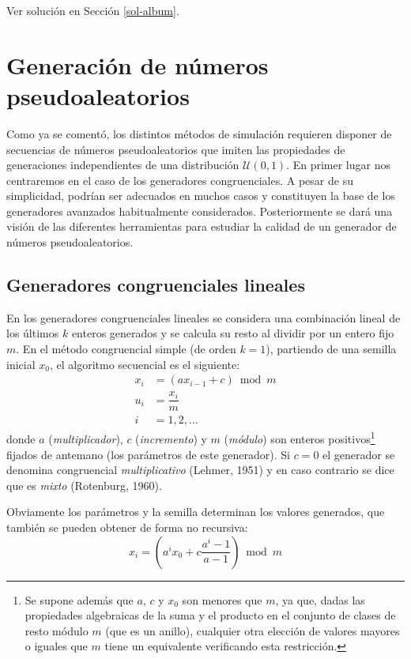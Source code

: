 \documentclass[
]{book}
\theoremstyle{break}
\theoremstyle{nonumberplain}
\begin{document}
Ver solución en Sección \ref{sol-album}.

\hypertarget{gen-pseudo}{%
\chapter{Generación de números pseudoaleatorios}\label{gen-pseudo}}

Como ya se comentó, los distintos métodos de simulación requieren disponer de secuencias de números pseudoaleatorios que imiten las propiedades de generaciones independientes de una distribución \(\mathcal{U}(0,1)\).
En primer lugar nos centraremos en el caso de los generadores congruenciales. A pesar de su simplicidad, podrían ser adecuados en muchos casos y constituyen la base de los generadores avanzados habitualmente considerados.
Posteriormente se dará una visión de las diferentes herramientas para estudiar la calidad de un generador de números pseudoaleatorios.

\hypertarget{gen-cong}{%
\section{Generadores congruenciales lineales}\label{gen-cong}}

En los generadores congruenciales lineales se considera una combinación lineal de los últimos \(k\) enteros generados y se calcula su resto al dividir por un entero fijo \(m\).
En el método congruencial simple (de orden \(k = 1\)), partiendo de una semilla inicial \(x_0\), el algoritmo secuencial es el siguiente:
\[\begin{aligned}
x_{i}  & = (ax_{i-1}+c) \bmod m \\
u_{i}  & = \dfrac{x_{i}}{m} \\
i  & =1,2,\ldots
\end{aligned}\]
donde \(a\) (\emph{multiplicador}), \(c\) (\emph{incremento}) y \(m\) (\emph{módulo}) son enteros positivos\footnote{Se supone además que \(a\), \(c\) y \(x_0\) son menores que \(m\), ya que, dadas las propiedades algebraicas de la suma y el producto en el conjunto de clases de resto módulo \(m\) (que es un anillo), cualquier otra elección de valores mayores o iguales que \(m\) tiene un equivalente verificando esta restricción.} fijados de antemano (los parámetros de este generador). Si \(c=0\) el generador se denomina congruencial \emph{multiplicativo} (Lehmer, 1951) y en caso contrario se dice que es \emph{mixto} (Rotenburg, 1960).

Obviamente los parámetros y la semilla determinan los valores generados, que también se pueden obtener de forma no recursiva:
\[x_{i}=\left( a^{i}x_0+c\frac{a^{i}-1}{a-1}\right) \bmod m\]
\end{document}
